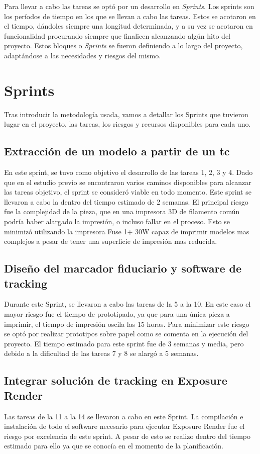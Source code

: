 Para llevar a cabo las tareas se optó por un desarrollo en \textit{Sprints}. Los sprints son los períodos de tiempo en los que se llevan a cabo las tareas. Estos se acotaron en el tiempo, dándoles siempre una longitud determinada, y a su vez se acotaron en funcionalidad procurando siempre que finalicen alcanzando algún hito del proyecto. Estos bloques o \textit{Sprints} se fueron definiendo a lo largo del proyecto, adaptándose a las necesidades y riesgos del mismo.

\section{Sprints}
Tras introducir la metodología usada, vamos a detallar los Sprints que tuvieron lugar en el proyecto, las tareas, los riesgos y recursos disponibles para cada uno.
\subsection{Extracción de un modelo a partir de un \acrshort{tc}}
En este sprint, se tuvo como objetivo el desarrollo de las tareas 1, 2, 3 y 4. Dado que en el estudio previo se encontraron varios caminos disponibles para alcanzar las tareas objetivo, el sprint se consideró viable en todo momento. Este sprint se llevaron a cabo la dentro del tiempo estimado de 2 semanas. El principal riesgo fue la complejidad de la pieza, que en una impresora 3D de filamento común podría haber alargado la impresión, o incluso fallar en el proceso. Esto se minimizó utilizando la impresora Fuse 1+ 30W capaz de imprimir modelos mas complejos a pesar de tener una superficie de impresión mas reducida.

\subsection{Diseño del marcador fiduciario y software de tracking}
Durante este Sprint, se llevaron a cabo las tareas de la 5 a la 10. En este caso el mayor riesgo fue el tiempo de prototipado, ya que para una única pieza a imprimir, el tiempo de impresión oscila las 15 horas. Para minimizar este riesgo se optó por realizar prototipos sobre papel como se comenta en la ejecución del proyecto. El tiempo estimado para este sprint fue de 3 semanas y media, pero debido a la dificultad de las tareas 7 y 8 se alargó a 5 semanas.

\subsection{Integrar solución de tracking en Exposure Render}
Las tareas de la 11 a la 14 se llevaron a cabo en este Sprint. La compilación e instalación de todo el software necesario para ejecutar Exposure Render fue el riesgo por excelencia de este sprint. A pesar de esto se realizo dentro del tiempo estimado para ello ya que se conocía en el momento de la planificación.

